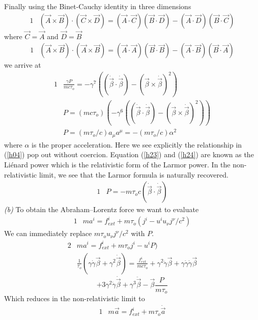 \documentclass[]{article}
\numberwithin{equation}{subsection}
\begin{document}
Finally using the Binet-Cauchy identity in three dimensions
	\begin{alignat}{1}
	\label{hh03}		&(\vec{A}\times\vec{B})\cdot(\vec{C}\times\vec{D})=(\vec{A}\cdot\vec{C})(\vec{B}\cdot\vec{D})-(\vec{A}\cdot\vec{D})(\vec{B}\cdot\vec{C})
	\end{alignat}
where $\vec{C}=\vec{A}$ and $\vec{D}=\vec{B}$
	\begin{alignat}{1}
	\label{hh04}		&(\vec{A}\times\vec{B})\cdot(\vec{A}\times\vec{B})=(\vec{A}\cdot\vec{A})(\vec{B}\cdot\vec{B})-(\vec{A}\cdot\vec{B})(\vec{B}\cdot\vec{A})
	\end{alignat}
we arrive at
	\begin{alignat}{1}
	\label{h22}		&\frac{\gamma P}{mc\tau_{o}}=-\gamma^{7}((\dot{\vec{\beta}}\cdot\dot{\vec{\beta}})-(\vec{\beta}\times\dot{\vec{\beta}})^{2})\\
	\label{h23}		&P=(mc\tau_{o})(-\gamma^{6}((\dot{\vec{\beta}}\cdot\dot{\vec{\beta}})-(\vec{\beta}\times\dot{\vec{\beta}})^{2}))\\
	\label{h24}		&P=(m\tau_{o}/c)a_{\mu}a^{\mu}=-(m\tau_{o}/c)\alpha^{2}
	\end{alignat}
where $\alpha$ is the proper acceleration. Here we see explicitly the relationship in (\ref{h04}) pop out without coercion. Equation (\ref{h23}) and (\ref{h24}) are known as the Li\'enard power which is the relativistic form of the Larmor power. In the non-relativistic limit, we see that the Larmor formula is naturally recovered.
	\begin{alignat}{1}
	\label{h26}		&P=-m\tau_{o}c(\dot{\vec{\beta}}\cdot\dot{\vec{\beta}})
	\end{alignat}
\emph{(b)} To obtain the Abraham--Lorentz force we want to evaluate
	\begin{alignat}{1}
	\label{h27}		&ma^{i}=f^{i}_{ext}+m\tau_{o}(j^{i}-u^{i}u_{\nu}j^{\nu}/c^{2})
	\end{alignat}
We can immediately replace $m\tau_{o}u_{\nu}j^{\nu}/c^{2}$ with $P$.
	\begin{alignat}{2}
	\label{h28}		&ma^{i}=f^{i}_{ext}+m\tau_{o}j^{i}-u^{i}P)\\
	\label{h29}		&\frac{1}{\tau_{o}}(\gamma\dot{\gamma}\vec{\beta}+\gamma^{2}\dot{\vec{\beta}})=\frac{f^{i}_{ext}}{mc\tau_{o}}+\gamma^{2}\ddot{\gamma}\vec{\beta}+\gamma\dot{\gamma}\dot{\gamma}\vec{\beta}
	\end{alignat}
	$$
		+3\gamma^{2}\dot{\gamma}\dot{\vec{\beta}}+\gamma^{3}\ddot{\vec{\beta}}-\vec{\beta}\frac{P}{m\tau_{o}}
	$$
Which reduces in the non-relativistic limit to
	\begin{alignat}{1}
	\label{h30}		&m\vec{a}=f^{i}_{ext}+m\tau_{o}\dot{\vec{a}}
	\end{alignat}
\end{document}
